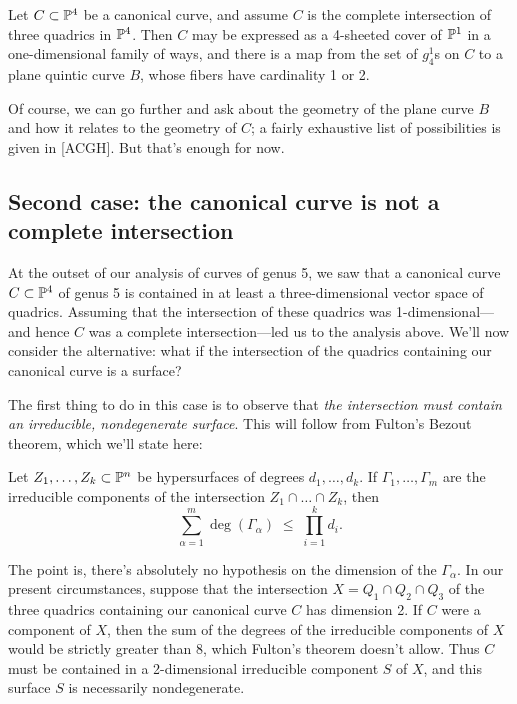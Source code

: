 \begin{proposition}
Let $C \subset \PP^4$ be a canonical curve, and assume $C$ is the complete intersection of three quadrics in $\PP^4$. Then $C$ may be expressed as a 4-sheeted cover of $\PP^1$ in a one-dimensional family of ways, and there is a map from the set of $g^1_4$s on $C$ to a plane quintic curve $B$, whose fibers have cardinality 1 or 2.
\end{proposition}


Of course, we can go further and ask about the geometry of the plane curve $B$ and how it relates to the geometry of $C$; a fairly exhaustive list of possibilities is given in \cite{****} [ACGH]. But that's enough for now.

\subsection{Second case: the canonical curve is not a complete intersection}

At the outset of our analysis of curves of genus 5, we saw that a canonical curve $C \subset \PP^4$ of genus 5 is contained in at least a three-dimensional vector space of quadrics. Assuming that the intersection of these quadrics was 1-dimensional---and hence $C$ was a complete intersection---led us to the analysis above. We'll now consider the alternative: what if the intersection of the quadrics containing our canonical curve is a surface?

The first thing to do in this case is to observe that \emph{the intersection must contain an irreducible, nondegenerate surface}. This will follow from Fulton's Bezout theorem, which we'll state here:

\begin{theorem}
Let $Z_1,\dots, Z_k \subset \PP^n$ be hypersurfaces of degrees $d_1,\dots,d_k$. If $\Gamma_1,\dots,\Gamma_m$ are the irreducible components of the intersection $Z_1 \cap \dots \cap Z_k$, then
$$
\sum_{\alpha = 1}^m \deg(\Gamma_\alpha) \; \leq \; \prod_{i=1}^k d_i.
$$
\end{theorem}

The point is, there's absolutely no hypothesis on the dimension of the $\Gamma_\alpha$. In our present circumstances, suppose that the intersection $X = Q_1 \cap Q_2 \cap Q_3$ of the three quadrics containing our canonical curve $C$ has dimension 2. If $C$ were a component of $X$, then the sum of the degrees of the irreducible components of $X$ would be strictly greater than 8, which Fulton's theorem doesn't allow. Thus $C$ must be contained in a 2-dimensional irreducible component  $S$ of $X$, and this surface $S$ is necessarily nondegenerate.

